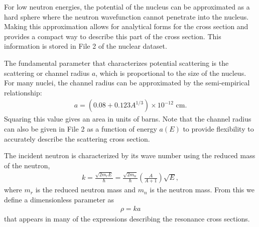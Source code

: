 For low neutron energies, the potential of the nucleus can be approximated as a hard sphere where the neutron wavefunction cannot penetrate into the nucleus. Making this approximation allows for analytical forms for the cross section and provides a compact way to describe this part of the cross section. This information is stored in File 2 of the nuclear dataset.

The fundamental parameter that characterizes potential scattering is the scattering or channel radius $a$, which is proportional to the size of the nucleus. For many nuclei, the channel radius can be approximated by the semi-empirical relationship:
\begin{align}
  a = ( 0.08 + 0.123 A^{1/3} ) \times 10^{-12} \text{ cm}.
\end{align}
Squaring this value gives an area in units of barns. Note that the channel radius can also be given in File 2 as a function of energy $a(E)$ to provide flexibility to accurately describe the scattering cross section.

The incident neutron is characterized by its wave number using the reduced mass of the neutron,
\begin{align}
  k = \frac{ \sqrt{ 2 m_r E }}{ \hbar } = \frac{ \sqrt{ 2 m_n }}{ \hbar }  \left( \frac{A}{A+1} \right) \sqrt{E} ,
\end{align}
where $m_r$ is the reduced neutron mass and $m_n$ is the neutron mass. From this we define a dimensionless parameter as
\begin{align}
  \rho = k a 	\label{Eq:libraryGeneration_rho_ka}
\end{align}
that appears in many of the expressions describing the resonance cross sections.

